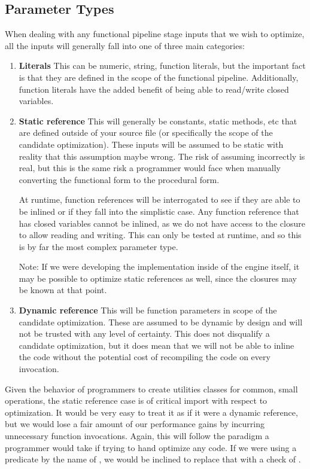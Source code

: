 \subsection{Parameter Types}
When dealing with any functional pipeline stage inputs that we wish to optimize, all the inputs will generally fall into one of three main categories:

\begin{enumerate}
  \item \textbf{Literals}
    This can be numeric, string, function literals, but the important fact is that they are defined in the scope of the functional pipeline.  Additionally, function literals have the added benefit of being able to read/write closed variables.

  \item \textbf{Static reference}
    This will generally be constants, static methods, etc that are defined outside of your source file (or specifically the scope of the candidate optimization).  These inputs will be assumed to be static with reality that this assumption maybe wrong.  The risk of assuming incorrectly is real, but this is the same risk a programmer would face when manually converting the functional form to the procedural form.  
    
    At runtime, function references will be interrogated to see if they are able to be inlined or if they fall into the simplistic case.  Any function reference that has closed variables cannot be inlined, as we do not have access to the closure to allow reading and writing.  This can only be tested at runtime, and so this is by far the most complex parameter type.  
    
    Note: If we were developing the implementation inside of the \javascript engine itself, it may be possible to optimize static references as well, since the closures may be known at that point.

  \item \textbf{Dynamic reference}
    This will be function parameters in scope of the candidate optimization. These are assumed to be dynamic by design and will not be trusted with any level of certainty.  This does not disqualify a candidate optimization, but it does mean that we will not be able to inline the code without the potential cost of recompiling the code on every invocation.
\end{enumerate}

Given the behavior of programmers to create utilities classes for common, small operations, the static reference case is of critical import with respect to optimization.  It would be very easy to treat it as if it were a dynamic reference, but we would lose a fair amount of our performance gains by incurring unnecessary function invocations.  Again, this will follow the paradigm a programmer would take if trying to hand optimize any code.  If we were using a predicate by the name of , we would be inclined to replace that with a check of . 